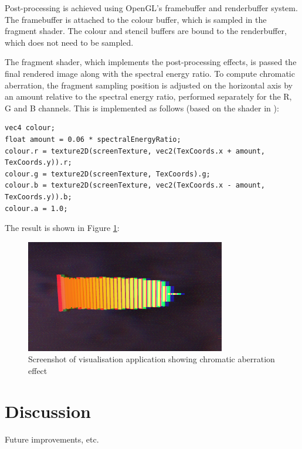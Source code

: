 \documentclass[11pt]{article}
\begin{document}
Post-processing is achieved using OpenGL's framebuffer and renderbuffer system. The framebuffer is attached to
the colour buffer, which is sampled in the fragment shader. The colour and stencil buffers are bound to the
renderbuffer, which does not need to be sampled.

The fragment shader, which implements the post-processing effects, is passed the final rendered image along
with the spectral energy ratio. To compute chromatic aberration, the fragment sampling position is adjusted on
the horizontal axis by an amount relative to the spectral energy ratio, performed separately for the R, G and
B channels. This is implemented as follows (based on the shader in \cite{godotChromatic}):

\begin{verbatim}
vec4 colour;
float amount = 0.06 * spectralEnergyRatio;
colour.r = texture2D(screenTexture, vec2(TexCoords.x + amount, TexCoords.y)).r;
colour.g = texture2D(screenTexture, TexCoords).g;
colour.b = texture2D(screenTexture, vec2(TexCoords.x - amount, TexCoords.y)).b;
colour.a = 1.0;
\end{verbatim}

The result is shown in Figure \ref{fig:chromatic}:

\begin{figure}[H]
\centering
\includegraphics[width=330px]{img/chromatic_small.png}
\caption{Screenshot of visualisation application showing chromatic aberration effect}
\label{fig:chromatic}
\end{figure}


\section{Discussion}
Future improvements, etc.
\end{document}
